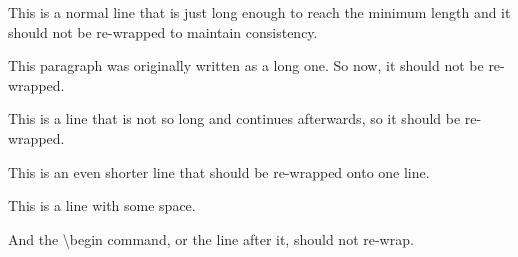 \documentclass{article}
\begin{document}

This is a normal line that is just long enough to reach the minimum length
and it should not be re-wrapped to maintain consistency.

This paragraph was originally written as a long one.
So now, it should not be re-wrapped.

This is a line that is not so long
and continues afterwards, so it should be re-wrapped.

This is an even shorter line
that should be re-wrapped onto one line.

This is a line with some space.
\begin{definition}
  And the \textbackslash{}begin command, or the line after it, should
  not re-wrap.
\end{definition}
\end{document}
